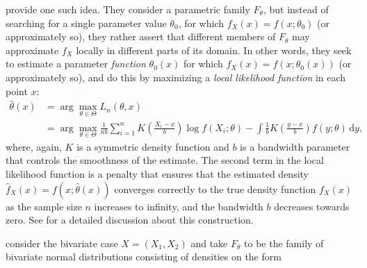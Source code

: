 \citet{hjor:jone:1996} provide one such idea. They consider a parametric family $F_{\theta}$, but instead of searching for a single parameter value $\theta_0$, for which $f_X(x) = f(x;\theta_0)$ (or approximately so), they rather assert that different members of $F_{\theta}$ may approximate $f_X$ locally in different parts of its domain. In other words, they seek to estimate a parameter \emph{function} $\theta_0(x)$ for which $f_X(x) = f(x;\theta_0(x))$ (or approximately so), and do this by maximizing a \emph{local likelihood function} in each point $x$:
\begin{align}
\widehat\theta(x) 
&= \arg\max_{\theta \in \Theta} L_n(\theta, x) \nonumber\\ 
&= \arg\max_{\theta \in \Theta} \frac{1}{nb}\sum_{i=1}^n K\left(\frac{X_i - x}{b}\right)\log f(X_i; \theta) - \int \frac{1}{b}K\left(\frac{y - x}{b}\right)f(y;\theta)\,\textrm{d}y,
\label{eq:loclik}
\end{align}
where, again, $K$ is a symmetric density function and $b$ is a bandwidth parameter that controls the smoothness of the estimate. The second term in the local likelihood function is a penalty that ensures that the estimated density $\widehat f_X(x) = f(x; \widehat\theta(x))$ converges correctly to the true density function $f_X(x)$ as the sample size $n$ increases to infinity, and the bandwidth $b$ decreases towards zero. See \citet{hjor:jone:1996} for a detailed discussion about this construction.

\citet{tjos:huft:2013} consider the bivariate case $X = (X_1, X_2)$ and take $F_{\theta}$ to be the family of bivariate normal distributions consisting of densities on the form

